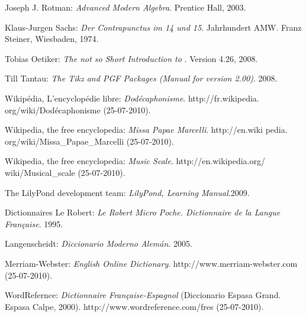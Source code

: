 \documentclass[letterpaper,12pt]{book}
\theoremstyle{definition} \newtheorem{Def}{Definición}[chapter]
\theoremstyle{definition} \newtheorem{Teo}{Teorema}[chapter]
\theoremstyle{definition} \newtheorem{Pro}{Proposición}[chapter]
\theoremstyle{definition} \newtheorem{Lema}{Lema}[chapter]
\begin{document}
\begin{thebibliography}{30}
 Joseph J. Rotman: \emph{Advanced Modern Algebra}. Prentice Hall, 2003.

 Klaus-Jurgen Sachs: \emph{Der Contrapunctus im 14 und 15}. Jahrhundert AMW. Franz Steiner, Wiesbaden, 1974.

 Tobias Oetiker: \emph{The not so Short Introduction to \LaTeXe}. Version 4.26, 2008.

 Till Tantau: \emph{The Tikz and PGF Packages (Manual for version 2.00)}. 2008.

 Wikipédia, L'encyclopédie libre: \emph{Dodécaphonisme}. http://fr.wikipedia. org/wiki/Dodécaphonisme (25-07-2010).

 Wikipedia, the free encyclopedia: \emph{Missa Papae Marcelli}. http://en.wiki pedia. org/wiki/Missa\_Papae\_Marcelli (25-07-2010).

 Wikipedia, the free encyclopedia: \emph{Music Scale}. http://en.wikipedia.org/ wiki/Musical\_scale (25-07-2010).

 The LilyPond development team: \emph{LilyPond, Learning Manual}.2009.

 Dictionnaires Le Robert: \emph{Le Robert Micro Poche. Dictionnaire de la Langue Française}. 1995.

 Langenscheidt: \emph{Diccionario Moderno Alemán}. 2005.

 Merriam-Webster: \emph{English Online Dictionary}.
http://www.merriam-webster.com (25-07-2010).

 WordRefernce: \emph{Dictionnaire Française-Espagnol} (Diccionario Espasa Grand. Espasa Calpe, 2000).
http://www.wordreference.com/fres (25-07-2010).

\end{thebibliography}

\printindex
\end{document}
